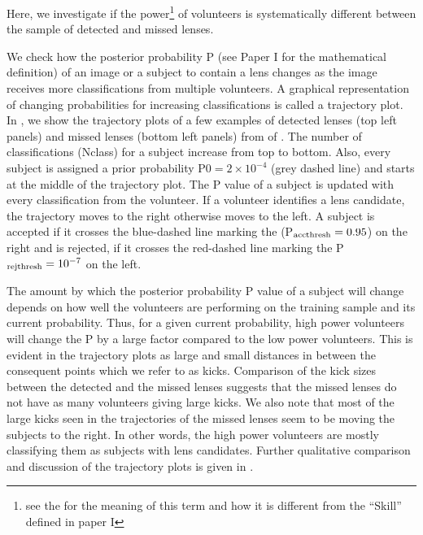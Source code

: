 \documentclass[useAMS,usenatbib,a4paper]{mn2e}
\begin{document}
Here, we investigate if the power\footnote{see the
 for the meaning of this term and how it is
different from the ``Skill'' defined in paper I} of volunteers is systematically
different between the sample of detected and missed lenses.

We check how the posterior probability P (see Paper I for the
mathematical definition) of an image or a subject to contain a lens
changes as the image receives more classifications from multiple
volunteers. A graphical representation of changing probabilities for
increasing classifications is called a trajectory plot. In
, we show the trajectory plots of a few examples of
detected lenses (top left panels) and missed lenses (bottom left panels)
from \StageOne of \sw. The number of classifications (Nclass) for a
subject increase from top to bottom.  Also, every subject is assigned a
prior probability P0$=2\times10^{-4}$ (grey dashed line) and starts at
the middle of the trajectory plot. The P value of a subject is updated
with every classification from the volunteer.  If a volunteer identifies
a lens candidate, the trajectory moves to the right otherwise moves to
the left. A subject is accepted if it crosses the blue-dashed line
marking the (P$_{\rm acc thresh}=0.95$) on the right and is rejected, if
it crosses the red-dashed line marking the P$_{\rm rej thresh}=10^{-7}$
on the left.

The amount by which the posterior probability P value of a subject will
change depends on how well the volunteers are performing on the training
sample and its current probability. Thus, for a given current
probability, high power volunteers will change the P by a large factor
compared to the low power volunteers. This is evident in the trajectory
plots as large and small distances in between the consequent points
which we refer to as kicks. Comparison of the kick sizes between the
detected and the missed lenses suggests that the missed lenses do not
have as many volunteers giving large kicks. We also note that most of
the large kicks seen in the trajectories of the missed lenses seem to be
moving the subjects to the right. In other words, the high power
volunteers are mostly classifying them as subjects with lens candidates.
Further qualitative comparison and discussion of the trajectory plots is
given in .
\end{document}
